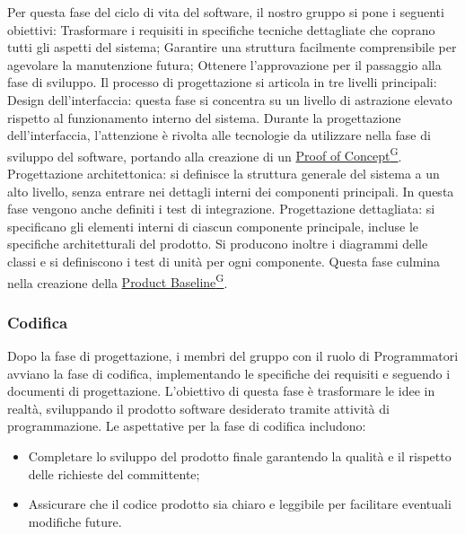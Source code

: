 Per questa fase del ciclo di vita del software, il nostro gruppo si pone i seguenti obiettivi:
Trasformare i requisiti in specifiche tecniche dettagliate che coprano tutti gli aspetti del sistema;
Garantire una struttura facilmente comprensibile per agevolare la manutenzione futura;
Ottenere l’approvazione per il passaggio alla fase di sviluppo.
Il processo di progettazione si articola in tre livelli principali:
Design dell’interfaccia: questa fase si concentra su un livello di astrazione elevato rispetto 
al funzionamento interno del sistema. Durante la progettazione dell’interfaccia, l’attenzione 
è rivolta alle tecnologie da utilizzare nella fase di sviluppo del software, portando alla creazione di un \href{https://code7crusaders.github.io/docs/RTB/documentazione_interna/glossario.html#poc-proof-of-concept}{Proof of Concept\textsuperscript{G}}.
Progettazione architettonica: si definisce la struttura generale del sistema a un alto livello, 
senza entrare nei dettagli interni dei componenti principali. In questa fase vengono anche definiti i test di integrazione.
Progettazione dettagliata: si specificano gli elementi interni di ciascun componente principale, 
incluse le specifiche architetturali del prodotto. Si producono inoltre i diagrammi delle classi e si 
definiscono i test di unità per ogni componente. Questa fase culmina nella creazione della \href{https://code7crusaders.github.io/docs/RTB/documentazione_interna/glossario.html#pb-product-baseline}{Product Baseline\textsuperscript{G}}.



\subsubsection{Codifica}
Dopo la fase di progettazione, i membri del gruppo con il ruolo di Programmatori avviano la fase di codifica, 
implementando le specifiche dei requisiti e seguendo i documenti di progettazione.
L’obiettivo di questa fase è trasformare le idee in realtà, sviluppando il prodotto software desiderato tramite 
attività di programmazione.
Le aspettative per la fase di codifica includono:
\begin{itemize}
    \item Completare lo sviluppo del prodotto finale garantendo la qualità e il rispetto delle richieste del committente;
    \item Assicurare che il codice prodotto sia chiaro e leggibile per facilitare eventuali modifiche future.
\end{itemize}
